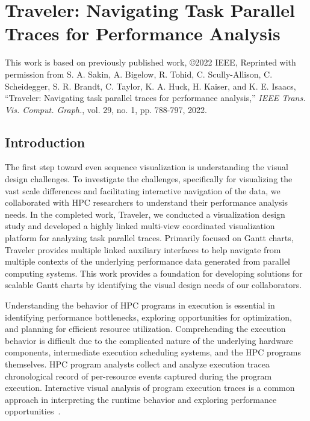 
\chapter[Traveler: Navigating Task Parallel Traces for Performance Analysis]{Traveler: Navigating Task Parallel \\ Traces for Performance Analysis}
\label{chap:traveler}

\begin{refsection}
This work is based on previously published work, \copyright  2022 IEEE, Reprinted with permission from S. A. Sakin, A. Bigelow, R. Tohid, C. Scully-Allison, C. Scheidegger, S. R. Brandt, C. Taylor, K. A. Huck, H. Kaiser, and K. E. Isaacs, ``Traveler: Navigating task parallel traces for performance analysis,'' \emph{IEEE Trans. Vis. Comput. Graph.}, vol. 29, no. 1, pp. 788-797, 2022.

\section{Introduction}
The first step toward even sequence visualization is understanding the visual design challenges. To investigate the challenges, specifically for visualizing the vast scale differences and facilitating interactive navigation of the data, we collaborated with HPC researchers to understand their performance analysis needs. In the completed work, Traveler, we conducted a visualization design study and developed a highly linked multi-view coordinated visualization platform for analyzing task parallel traces. Primarily focused on Gantt charts, Traveler provides multiple linked auxiliary interfaces to help navigate from multiple contexts of the underlying performance data generated from parallel computing systems. This work provides a foundation for developing solutions for scalable Gantt charts by identifying the visual design needs of our collaborators.

Understanding the behavior of HPC programs in execution is essential in identifying performance bottlenecks, exploring opportunities for optimization, and planning for efficient resource utilization. Comprehending the execution behavior is difficult due to the complicated nature of the underlying hardware components, intermediate execution scheduling systems, and the HPC programs themselves. HPC program analysts collect and analyze execution trace\textemdash a chronological record of per-resource events captured during the program execution. Interactive visual analysis of program execution traces is a common approach in interpreting the runtime behavior and exploring performance opportunities~\cite{isaacs2014state}. 


\end{refsection}
